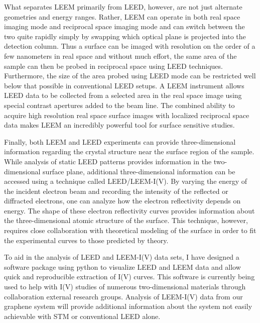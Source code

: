 What separates LEEM primarily from LEED, however, are not just alternate geometries and energy ranges. Rather, LEEM can operate in both real space imaging mode and reciprocal space imaging mode and can switch between the two quite rapidly simply by swapping which optical plane is projected into the detection column. Thus a surface can be imaged with resolution on the order of a few nanometers in real space and without much effort, the same area of the sample can then be probed in reciprocal space using LEED techniques. Furthermore, the size of the area probed using LEED mode can be restricted well below that possible in conventional LEED setups. A LEEM instrument  allows LEED data to be collected from a selected area in the real space image using special contrast apertures added to the beam line. The combined ability to acquire high resolution real space surface images with localized reciprocal space data makes LEEM an incredibly powerful tool for surface sensitive studies.   

Finally, both LEEM and LEED experiments can provide three-dimensional information regarding the crystal structure near the surface region of the sample. While analysis of static LEED patterns provides information in the two-dimensional surface plane, additional three-dimensional information can be accessed using a technique called LEED/LEEM-I(V). By varying the energy of the incident electron beam and recording the intensity of the reflected or diffracted electrons, one can analyze how the electron reflectivity depends on energy. The shape of these electron reflectivity curves provides information about the three-dimensional atomic structure of the surface. This technique, however, requires close collaboration with theoretical modeling of the surface in order to fit the experimental curves to those predicted by theory.

To aid in the analysis of LEED and LEEM-I(V) data sets, I have designed a software package using python to visualize LEED and LEEM data and allow quick and reproducible extraction of I(V) curves. This software is currently being used to help with I(V) studies of numerous two-dimensional materials through collaboration external research groups. Analysis of LEEM-I(V) data from our graphene system will provide additional information about the system not easily achievable with STM or conventional LEED alone.

